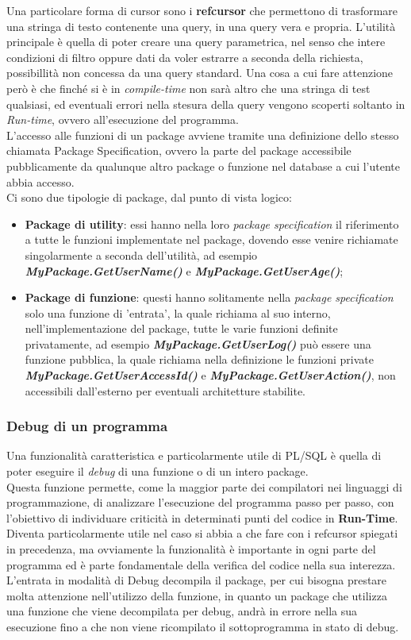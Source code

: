 Una particolare forma di cursor sono i \textbf{refcursor} che permettono di trasformare una stringa di testo contenente una query, in una query vera e propria. L'utilità principale è quella di poter creare una query parametrica, nel senso che intere condizioni di filtro oppure dati da voler estrarre a seconda della richiesta, possibillità non concessa da una query standard. Una cosa a cui fare attenzione però è che finché si è in \textit{compile-time} non sarà altro che una stringa di test qualsiasi, ed eventuali errori nella stesura della query vengono scoperti soltanto in \textit{Run-time}, ovvero all'esecuzione del programma.\\
L'accesso alle funzioni di un package avviene tramite una definizione dello stesso chiamata Package Specification, ovvero la parte del package accessibile pubblicamente da qualunque altro package o funzione nel database a cui l'utente abbia accesso.\\
Ci sono due tipologie di package, dal punto di vista logico:
\begin{itemize}
\item \textbf{Package di utility}: essi hanno nella loro \textit{package specification} il riferimento a tutte le funzioni implementate nel package, dovendo esse venire richiamate singolarmente a seconda dell'utilità, ad esempio \textbf{\textit{MyPackage.GetUserName()}} e \textbf{\textit{MyPackage.GetUserAge()}};
\item \textbf{Package di funzione}: questi hanno solitamente nella \textit{package specification} solo una funzione di 'entrata', la quale richiama al suo interno, nell'implementazione del package, tutte le varie funzioni definite privatamente, ad esempio \textbf{\textit{MyPackage.GetUserLog()}} può essere una funzione pubblica, la quale richiama nella definizione le funzioni private \textbf{\textit{MyPackage.GetUserAccessId()}} e \textbf{\textit{MyPackage.GetUserAction()}}, non accessibili dall'esterno per eventuali architetture stabilite.
\end{itemize}
\subsubsection{Debug di un programma}
Una funzionalità caratteristica e particolarmente utile di PL/SQL è quella di poter eseguire il \textit{debug} di una funzione o di un intero package.\\
Questa funzione permette, come la maggior parte dei compilatori nei linguaggi di programmazione, di analizzare l'esecuzione del programma passo per passo, con l'obiettivo di individuare criticità in determinati punti del codice in \textbf{Run-Time}. Diventa particolarmente utile nel caso si abbia a che fare con i refcursor spiegati in precedenza, ma ovviamente la funzionalità è importante in ogni parte del programma ed è parte fondamentale della verifica del codice nella sua interezza.\\
L'entrata in modalità di Debug decompila il package, per cui bisogna prestare molta attenzione nell'utilizzo della funzione, in quanto un package che utilizza una funzione che viene decompilata per debug, andrà in errore nella sua esecuzione fino a che non viene ricompilato il sottoprogramma in stato di debug.
